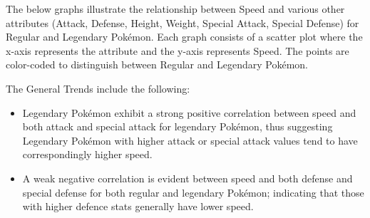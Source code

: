 \documentclass[
]{article}
\begin{document}
The below graphs illustrate the relationship between Speed and various
other attributes (Attack, Defense, Height, Weight, Special Attack,
Special Defense) for Regular and Legendary Pokémon. Each graph consists
of a scatter plot where the x-axis represents the attribute and the
y-axis represents Speed. The points are color-coded to distinguish
between Regular and Legendary Pokémon.

The General Trends include the following:

\begin{itemize}
\item
  Legendary Pokémon exhibit a strong positive correlation between speed
  and both attack and special attack for legendary Pokémon, thus
  suggesting Legendary Pokémon with higher attack or special attack
  values tend to have correspondingly higher speed.
\item
  A weak negative correlation is evident between speed and both defense
  and special defense for both regular and legendary Pokémon; indicating
  that those with higher defence stats generally have lower speed.
\end{itemize}
\end{document}
